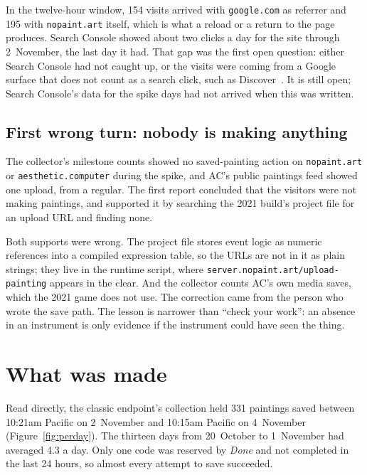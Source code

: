 \documentclass[10pt,letterpaper,twocolumn]{article}
\begin{document}
In the twelve-hour window, 154 visits arrived with \texttt{google.com}
as referrer and 195 with \texttt{nopaint.art} itself, which is what a
reload or a return to the page produces. Search Console showed about two
clicks a day for the site through 2~November, the last day it had. That
gap was the first open question: either Search Console had not caught
up, or the visits were coming from a Google surface that does not count
as a search click, such as Discover~\citep{google2026discover}. It is
still open; Search Console's data for the spike days had not arrived
when this was written.

\subsection{First wrong turn: nobody is making anything}

The collector's milestone counts showed no saved-painting
action on \texttt{nopaint.art} or \texttt{aesthetic.computer} during
the spike, and AC's public paintings feed showed one upload, from a
regular. The first report concluded that the visitors were not making
paintings, and supported it by searching the 2021 build's project file
for an upload URL and finding none.

Both supports were wrong. The project file stores event logic as
numeric references into a compiled expression table, so the URLs are
not in it as plain strings; they live in the runtime script, where
\texttt{server.nopaint.art/upload-painting} appears in the clear. And
the collector counts AC's own media saves, which the 2021 game does not
use. The correction came from the person who wrote the save path. The
lesson is narrower than ``check your work'': an absence in an instrument
is only evidence if the instrument could have seen the thing.

\section{What was made}
\label{sec:made}

Read directly, the classic endpoint's collection held 331 paintings
saved between 10:21am Pacific on 2~November and 10:15am Pacific on
4~November (Figure~\ref{fig:perday}). The thirteen days from
20~October to 1~November had averaged 4.3 a day. Only one code was reserved by \emph{Done} and not completed
in the last 24 hours, so almost every attempt to save succeeded.
\end{document}
